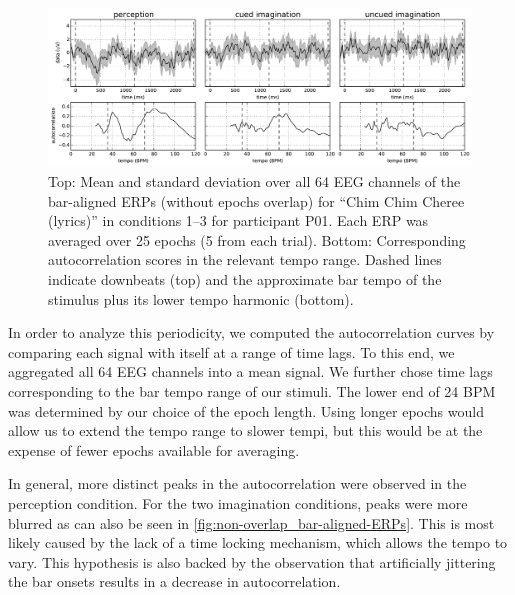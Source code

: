 \begin{figure}[t]
  \begin{center}
    \includegraphics[width=\textwidth,keepaspectratio=true]{Figures/non-overlap_bar-aligned-ERPs.pdf}
    \caption{%
Top: Mean and standard deviation over all 64 EEG channels of the bar-aligned ERPs
(without epochs overlap)
for ``Chim Chim Cheree (lyrics)'' in conditions 1--3 for participant P01.
Each ERP was averaged over 25 epochs (5 from each trial).
Bottom: Corresponding autocorrelation scores in the relevant tempo range.
Dashed lines indicate downbeats (top) and the approximate bar tempo of the stimulus plus its lower tempo harmonic (bottom).
}
    \label{fig:non-overlap_bar-aligned-ERPs}
  \end{center}
\end{figure}

In order to analyze this periodicity, we computed the autocorrelation curves by comparing each signal with itself at a range of time lags.
To this end, we aggregated all 64 EEG channels into a mean signal.
We further chose time lags corresponding to the bar tempo range of our stimuli.
The lower end of 24 BPM was determined by our choice of the epoch length. 
Using longer epochs would allow us to extend the tempo range to slower tempi, but this would be at the expense of fewer epochs available for averaging.

In general, more distinct peaks in the autocorrelation were observed in the perception condition.
For the two imagination conditions, peaks were more blurred as can also be seen in \autoref{fig:non-overlap_bar-aligned-ERPs}.
This is most likely caused by the lack of a time locking mechanism, which allows the tempo to vary.
This hypothesis is also backed by the observation that artificially jittering the bar onsets results in a decrease in autocorrelation.

